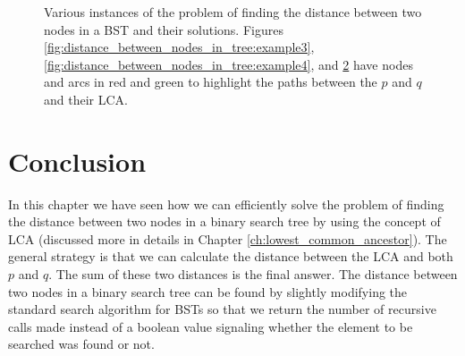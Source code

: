 \begin{figure}
\begin{subfigure}[b]{0.3\textwidth}
		\caption{}
		\label{fig:distance_between_nodes_in_tree:example5}
	\end{subfigure}
	\caption{Various instances of the problem of finding the distance between two nodes in a BST and
	their solutions. Figures \ref{fig:distance_between_nodes_in_tree:example3},
	\ref{fig:distance_between_nodes_in_tree:example4}, and
	\ref{fig:distance_between_nodes_in_tree:example5} have nodes and arcs in red and green to
	highlight the paths between the $p$ and $q$ and their LCA.}
\end{figure}



	



\section{Conclusion}
In this chapter we have seen how we can efficiently solve the problem of finding the distance between two nodes in a binary search tree
by using the concept of LCA (discussed more in details in Chapter \ref{ch:lowest_common_ancestor}). The general strategy is that
we can calculate the distance between the LCA and both $p$ and $q$. The sum of these two distances is the final answer.
The distance between two nodes in a binary search tree can be found by slightly modifying the standard search algorithm for BSTs so that we return
the number of recursive calls made instead of a boolean value signaling whether the element to be searched was found or not.